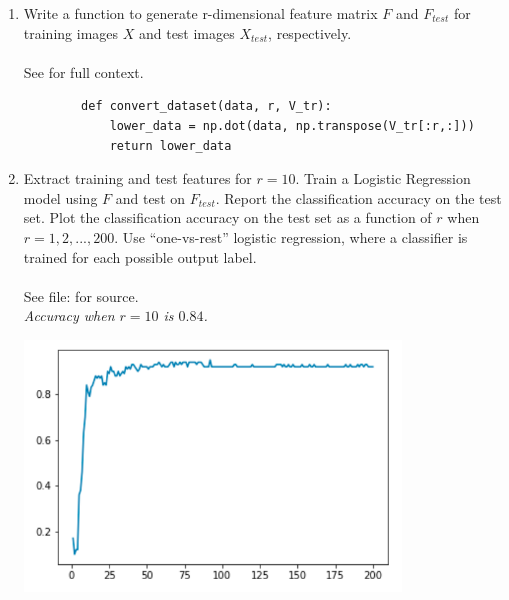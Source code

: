 \documentclass{report}
\begin{document}
\begin{enumerate}
\begin{enumerate}[label=(\alph*)]
\begin{center}
		\end{center}
		\item Write a function to generate r-dimensional feature
matrix $F$ and $F_{test}$ for training images $X$ and test images $X_{test}$, respectively. \\ \\
		See  for full context.
		\begin{lstlisting}
		def convert_dataset(data, r, V_tr):
    		lower_data = np.dot(data, np.transpose(V_tr[:r,:]))
    		return lower_data
		\end{lstlisting}
		\item Extract training and test features for $r = 10$. Train a Logistic Regression model using $F$ and test on $F_{test}$. Report the classification accuracy on the test set. Plot the classification accuracy on the test set as a function of $r$ when $r = 1, 2, . . . , 200$. Use “one-vs-rest” logistic regression, where a classifier is trained for each possible output label. \\ \\
		See file:  for source.\\
		\textit{Accuracy when $r=10$ is $0.84$.}
		\begin{center}
		\includegraphics[width = 10cm]{images/accuracy.png}
		\end{center}
	\end{enumerate}
	
	\newpage
	

\end{enumerate}
\end{document}
